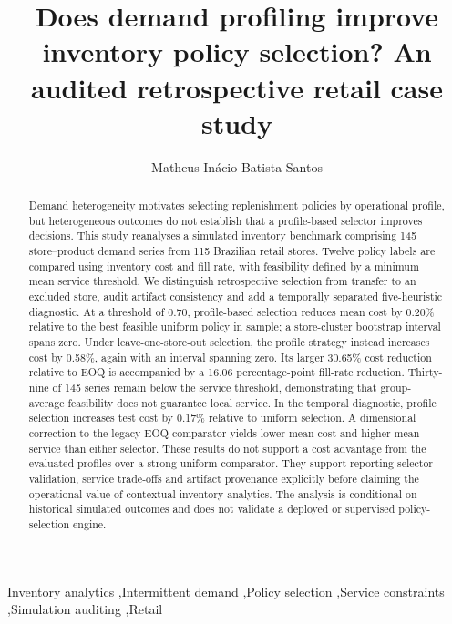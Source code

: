 \documentclass[preprint,12pt]{elsarticle}
\begin{document}
\begin{frontmatter}
\title{Does demand profiling improve inventory policy selection? An audited retrospective retail case study}
\author[ufal]{Matheus In\'acio Batista Santos}
\begin{abstract}
Demand heterogeneity motivates selecting replenishment policies by operational profile, but heterogeneous outcomes do not establish that a profile-based selector improves decisions. This study reanalyses a simulated inventory benchmark comprising 145 store--product demand series from 115 Brazilian retail stores. Twelve policy labels are compared using inventory cost and fill rate, with feasibility defined by a minimum mean service threshold. We distinguish retrospective selection from transfer to an excluded store, audit artifact consistency and add a temporally separated five-heuristic diagnostic. At a threshold of 0.70, profile-based selection reduces mean cost by 0.20\% relative to the best feasible uniform policy in sample; a store-cluster bootstrap interval spans zero. Under leave-one-store-out selection, the profile strategy instead increases cost by 0.58\%, again with an interval spanning zero. Its larger 30.65\% cost reduction relative to EOQ is accompanied by a 16.06 percentage-point fill-rate reduction. Thirty-nine of 145 series remain below the service threshold, demonstrating that group-average feasibility does not guarantee local service. In the temporal diagnostic, profile selection increases test cost by 0.17\% relative to uniform selection. A dimensional correction to the legacy EOQ comparator yields lower mean cost and higher mean service than either selector. These results do not support a cost advantage from the evaluated profiles over a strong uniform comparator. They support reporting selector validation, service trade-offs and artifact provenance explicitly before claiming the operational value of contextual inventory analytics. The analysis is conditional on historical simulated outcomes and does not validate a deployed or supervised policy-selection engine.
\end{abstract}
\begin{keyword}
Inventory analytics \sep Intermittent demand \sep Policy selection \sep Service constraints \sep Simulation auditing \sep Retail
\end{keyword}
\end{frontmatter}
\end{document}
